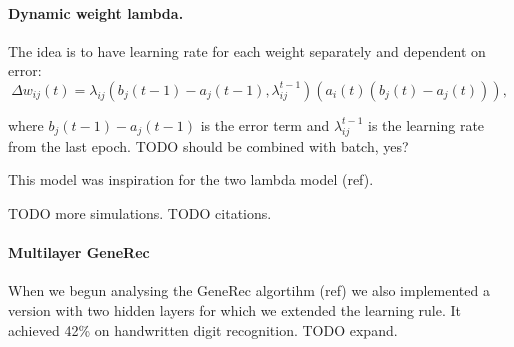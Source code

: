 
\paragraph{Dynamic weight lambda.} 

The idea is to have learning rate for each weight separately and dependent on error: 
\begin{equation}
\Delta w_{ij}(t) = \lambda_{ij}(b_j(t-1) - a_j(t-1), \lambda_{ij}^{t-1})(a_i(t)(b_j(t) - a_j(t))),
\end{equation}

where $b_j(t-1) - a_j(t-1)$ is the error term and $\lambda_{ij}^{t-1}$ is the learning rate from the last epoch. 
TODO should be combined with batch, yes? 

This model was inspiration for the two lambda model (ref). 

TODO more simulations. 
TODO citations.  

\paragraph{Multilayer GeneRec}

When we begun analysing the GeneRec algortihm (ref) we also implemented a version with two hidden layers for which we extended the learning rule. It achieved 42\% on handwritten digit recognition. 
TODO expand. 



